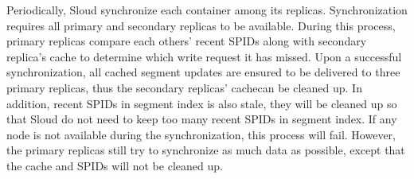 Periodically, Sloud synchronize each container among its replicas. Synchronization requires
all primary and secondary replicas to be available. During this process, 
primary replicas compare each others' recent SPIDs along with secondary replica's cache to determine which write request it has missed. 
Upon a successful synchronization, all cached segment updates are ensured
to be delivered to three primary replicas, thus the secondary replicas' cachecan be cleaned up. In addition,
recent SPIDs in segment index is also stale, they will be cleaned up so that Sloud do not need to keep too many recent SPIDs
in segment index. If any node is not available during the synchronization, this process will fail. However, the primary replicas
still try to synchronize as much data as possible, except that the cache and SPIDs will not be cleaned up.

